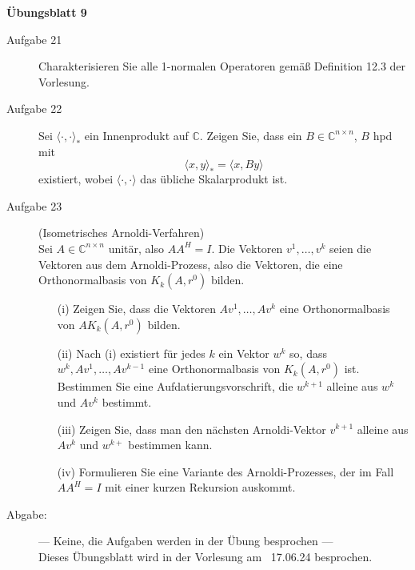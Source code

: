 \documentclass[a4paper,11pt]{scrartcl}
\begin{document}
\aihead

\begin{center}
  {\large\textbf{Übungsblatt 9}}
\end{center}


\begin{description}
\item[Aufgabe 21]
Charakterisieren Sie alle 1-normalen Operatoren gemäß Definition 12.3 der Vorlesung.
 \medskip
 
\item[Aufgabe 22]
Sei $\langle \cdot , \cdot \rangle_*$ ein Innenprodukt auf $\mathbb{C}$. Zeigen Sie, dass ein $B \in \mathbb{C}^{n\times n}$, $B$ hpd mit
\begin{equation*}
\langle x, y\rangle_* = \langle x, By \rangle
\end{equation*}
existiert, wobei $\langle \cdot , \cdot \rangle$ das übliche Skalarprodukt ist.
\medskip
 
\item[Aufgabe 23] (Isometrisches Arnoldi-Verfahren) \\
Sei $A \in \mathbb{C}^{n \times n}$ unitär, also $A A^H = I$. Die Vektoren $v^1, \ldots, v^k$ seien die Vektoren aus dem Arnoldi-Prozess, also die Vektoren, die eine Orthonormalbasis von $K_{k}(A,r^0)$ bilden.
\begin{itemize}
\item[(i)] Zeigen Sie, dass die Vektoren $Av^1, \ldots, Av^k$ eine Orthonormalbasis von $A K_{k}(A,r^0)$ bilden.
\item[(ii)] Nach (i) existiert für jedes $k$ ein Vektor $w^k$ so, dass
${w^k, Av^1, \ldots, Av^{k-1}}$ eine Orthonormalbasis von $K_{k}(A,r^0)$ ist. Bestimmen Sie eine Aufdatierungsvorschrift, die $w^{k+1}$ alleine aus $w^{k}$ und $Av^{k}$ bestimmt.
\item[(iii)] Zeigen Sie, dass man den nächsten Arnoldi-Vektor $v^{k+1}$ alleine aus $Av^k$ und $w^{k+}$ bestimmen kann.
\item[(iv)] Formulieren Sie eine Variante des Arnoldi-Prozesses, der im Fall $AA^H = I$ mit einer kurzen Rekursion auskommt.
\end{itemize}
\end{description}


\begin{description}
\item[Abgabe:] --- Keine, die Aufgaben werden in der Übung besprochen ---\\
Dieses Übungsblatt wird in der Vorlesung am ~17.06.24 besprochen.



\end{description}
\end{document}
